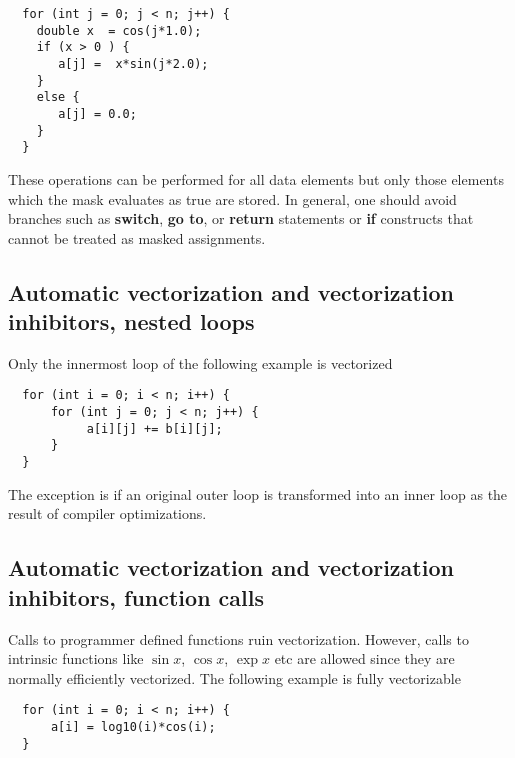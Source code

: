 \documentclass[%
oneside,                 %
final,                   %
10pt]{article}
\begin{document}
\begin{verbatim}
  for (int j = 0; j < n; j++) {
    double x  = cos(j*1.0);
    if (x > 0 ) {
       a[j] =  x*sin(j*2.0); 
    }
    else {
       a[j] = 0.0;
    }
  }

\end{verbatim}

These operations can be performed for all data elements but only those elements which the mask evaluates as true are stored. In general, one should avoid branches such as \textbf{switch}, \textbf{go to}, or \textbf{return} statements or \textbf{if} constructs that cannot be treated as masked assignments. 

\subsection*{Automatic vectorization and vectorization inhibitors, nested loops}

Only the innermost loop of the following example is vectorized






\begin{verbatim}
  for (int i = 0; i < n; i++) {
      for (int j = 0; j < n; j++) {
           a[i][j] += b[i][j];
      }  
  }

\end{verbatim}

The exception is if an original outer loop is transformed into an inner loop as the result of compiler optimizations.

\subsection*{Automatic vectorization and vectorization inhibitors, function calls}

Calls to programmer defined functions ruin vectorization. However, calls to intrinsic functions like
$\sin{x}$, $\cos{x}$, $\exp{x}$ etc are allowed since they are normally efficiently vectorized. 
The following example is fully vectorizable




\begin{verbatim}
  for (int i = 0; i < n; i++) {
      a[i] = log10(i)*cos(i);
  }

\end{verbatim}
\end{document}
